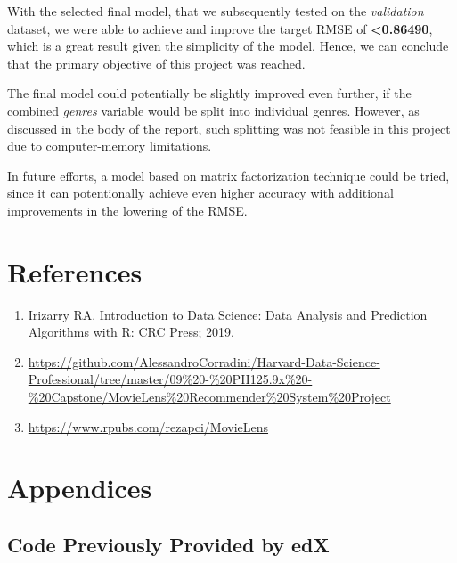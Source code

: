 \documentclass[
]{article}
\providecommand{\tightlist}{%
  \setlength{\itemsep}{0pt}\setlength{\parskip}{0pt}}
\begin{document}
With the selected final model, that we subsequently tested on the
\emph{validation} dataset, we were able to achieve and improve the
target RMSE of \textbf{\textless0.86490}, which is a great result given
the simplicity of the model. Hence, we can conclude that the primary
objective of this project was reached.

The final model could potentially be slightly improved even further, if
the combined \emph{genres} variable would be split into individual
genres. However, as discussed in the body of the report, such splitting
was not feasible in this project due to computer-memory limitations.

In future efforts, a model based on matrix factorization technique could
be tried, since it can potentionally achieve even higher accuracy with
additional improvements in the lowering of the RMSE.

\hypertarget{references}{%
\section{References}\label{references}}

\begin{enumerate}
\def\labelenumi{\arabic{enumi}.}
\tightlist
\item
  Irizarry RA. Introduction to Data Science: Data Analysis and
  Prediction Algorithms with R: CRC Press; 2019.
\item
  \url{https://github.com/AlessandroCorradini/Harvard-Data-Science-Professional/tree/master/09\%20-\%20PH125.9x\%20-\%20Capstone/MovieLens\%20Recommender\%20System\%20Project}
\item
  \url{https://www.rpubs.com/rezapci/MovieLens}
\end{enumerate}

\newpage

\hypertarget{appendices}{%
\section{Appendices}\label{appendices}}

\hypertarget{code-previously-provided-by-edx}{%
\subsection{Code Previously Provided by
edX}\label{code-previously-provided-by-edx}}
\end{document}
